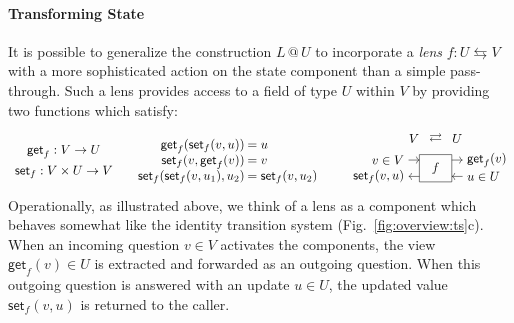 \documentclass[acmsmall,screen,review,anonymous]{acmart}
\newcommand{\kw}[1]{\ensuremath{ \mathsf{#1} }}
\newcommand{\lensarrow}{\leftrightarrows}
\begin{document}
\paragraph{Transforming State} %


It is possible to generalize the construction $L \mathbin@ U$
to incorporate a \emph{lens} $f : U \lensarrow V$
with a more sophisticated action on the state component
than a simple pass-through.
Such a lens provides access to a field of type $U$ within $V$
by providing two functions which satisfy:
\[
  \begin{array}{c}
    \kw{get}_f : V \rightarrow U \\[1ex]
    \kw{set}_f : V \times U \rightarrow V
  \end{array}
  \quad
  \begin{array}{r@{\:}l}
    \kw{get}_f(\kw{set}_f(v, u)) &= u \\
    \kw{set}_f(v, \kw{get}_f(v)) &= v \\
    \kw{set}_f(\kw{set}_f(v, u_1), u_2) &= \kw{set}_f(v, u_2)
  \end{array}
  \qquad
  \begin{tikzpicture}[yscale=0.15,xscale=0.30,baseline=(V.base)]
    \draw (5,-1) rectangle (8,4) node[midway] {$f$};
    \draw[->] (4,3) node[left] (V) {$v \in V$} -- (5,3) node[above=1em,midway] (A2) {$V$};
      \draw[->] (8,3) -- (9,3) node[above=1em,midway] (A1) {$U$} node[right] {$\kw{get}_f(v)$};
      \draw[->] (9,0) node[right] {$u \in U$} -- (8,0);
    \draw[->] (5,0) -- (4,0) node[left] {$\kw{set}_f(v, u)$};
    \path (A1) -- node {$\rightleftarrows$} (A2);
  \end{tikzpicture}
\]
Operationally,
as illustrated above,
we think of a lens as a component
which behaves somewhat like
the identity transition system
(Fig.~\ref{fig:overview:ts}c).
When an incoming question $v \in V$ activates the components,
the view $\kw{get}_f(v) \in U$ is extracted and
forwarded as an outgoing question.
When this outgoing question is answered with an update $u \in U$,
the updated value $\kw{set}_f(v, u)$ is returned to the caller.
\end{document}
